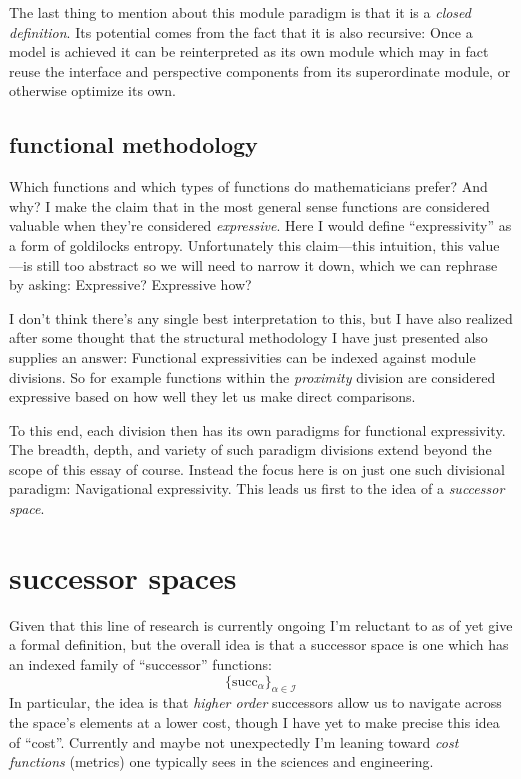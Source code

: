 \documentclass[twoside]{article}
\begin{document}
The last thing to mention about this module paradigm is that it is a \emph{closed definition}. Its potential comes from the
fact that it is also recursive: Once a model is achieved it can be reinterpreted as its own module which may in fact reuse
the interface and perspective components from its superordinate module, or otherwise optimize its own.

\subsection*{functional methodology}

Which functions and which types of functions do mathematicians prefer? And why? I make the claim that in the most
general sense functions are considered valuable when they're considered \emph{expressive}. Here I would define
``expressivity'' as a form of goldilocks entropy. Unfortunately this claim---this intuition, this value---is still too
abstract so we will need to narrow it down, which we can rephrase by asking: Expressive? Expressive how?

I don't think there's any single best interpretation to this, but I have also realized after some thought that the structural
methodology I have just presented also supplies an answer: Functional expressivities can be indexed against module divisions.
So for example functions within the \emph{proximity} division are considered expressive based on how well they let us make
direct comparisons.

To this end, each division then has its own paradigms for functional expressivity. The breadth, depth, and variety
of such paradigm divisions extend beyond the scope of this essay of course. Instead the focus here is on just one
such divisional paradigm: Navigational expressivity. This leads us first to the idea of a \emph{successor space}.

\section*{successor spaces}

Given that this line of research is currently ongoing I'm reluctant to as of yet give a formal definition,
but the overall idea is that a successor space is one which has an indexed family of ``successor'' functions:
$$ \{ \mbox{succ}_\alpha \}_{\alpha\in\mathcal{I}} $$
In particular, the idea is that \emph{higher order} successors allow us to navigate across the space's elements
at a lower cost, though I have yet to make precise this idea of ``cost''. Currently and maybe not unexpectedly
I'm leaning toward \emph{cost functions} (metrics) one typically sees in the sciences and engineering.
\end{document}
